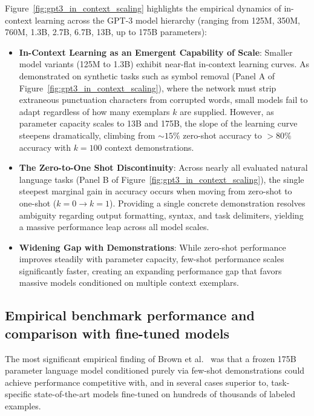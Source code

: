 \documentclass[../../main.tex]{subfiles}
\begin{document}
Figure~\ref{fig:gpt3_in_context_scaling} highlights the empirical dynamics of in-context learning across the GPT-3 model hierarchy (ranging from 125M, 350M, 760M, 1.3B, 2.7B, 6.7B, 13B, up to 175B parameters):
\begin{itemize}
    \item \textbf{In-Context Learning as an Emergent Capability of Scale}: Smaller model variants (125M to 1.3B) exhibit near-flat in-context learning curves. As demonstrated on synthetic tasks such as symbol removal (Panel A of Figure~\ref{fig:gpt3_in_context_scaling}), where the network must strip extraneous punctuation characters from corrupted words, small models fail to adapt regardless of how many exemplars $k$ are supplied. However, as parameter capacity scales to 13B and 175B, the slope of the learning curve steepens dramatically, climbing from $\sim 15\%$ zero-shot accuracy to $>80\%$ accuracy with $k = 100$ context demonstrations.
    
    \item \textbf{The Zero-to-One Shot Discontinuity}: Across nearly all evaluated natural language tasks (Panel B of Figure~\ref{fig:gpt3_in_context_scaling}), the single steepest marginal gain in accuracy occurs when moving from zero-shot to one-shot ($k=0 \to k=1$). Providing a single concrete demonstration resolves ambiguity regarding output formatting, syntax, and task delimiters, yielding a massive performance leap across all model scales.
    
    \item \textbf{Widening Gap with Demonstrations}: While zero-shot performance improves steadily with parameter capacity, few-shot performance scales significantly faster, creating an expanding performance gap that favors massive models conditioned on multiple context exemplars.
\end{itemize}


\subsection{Empirical benchmark performance and comparison with fine-tuned models}
\label{subsec:gpt3_empirical_results}

The most significant empirical finding of Brown et al.~\cite{brown2020} was that a frozen 175B parameter language model conditioned purely via few-shot demonstrations could achieve performance competitive with, and in several cases superior to, task-specific state-of-the-art models fine-tuned on hundreds of thousands of labeled examples.
\end{document}
